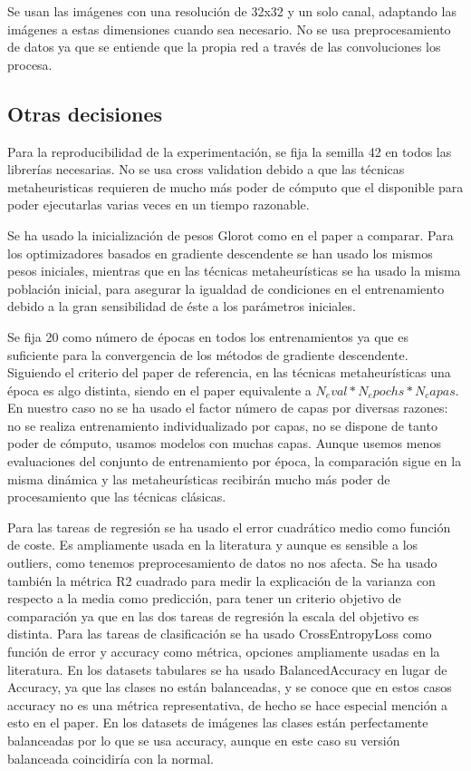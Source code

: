 Se usan las imágenes con una resolución de 32x32 y un solo canal, adaptando las imágenes a estas dimensiones cuando sea necesario. No se usa preprocesamiento de datos ya que se entiende que la propia red a través de las convoluciones los procesa.


\subsection{Otras decisiones}

Para la reproducibilidad de la experimentación, se fija la semilla 42 en todos las librerías necesarias. No se usa cross validation debido a que las técnicas metaheuristicas requieren de mucho más poder de cómputo que el disponible para poder ejecutarlas varias veces en un tiempo razonable.

Se ha usado la inicialización de pesos Glorot  como en el paper a comparar. Para los optimizadores basados en gradiente descendente se han usado los mismos pesos iniciales, mientras que en las técnicas metaheurísticas se ha usado la misma población inicial, para asegurar la igualdad de condiciones en el entrenamiento debido a la gran sensibilidad de éste a los parámetros iniciales. 

Se fija 20 como número de épocas en todos los entrenamientos ya que es suficiente para la convergencia de los métodos de gradiente descendente. Siguiendo el criterio del paper de referencia, en las técnicas metaheurísticas una época es algo distinta, siendo en el paper equivalente a $N_eval * N_epochs * N_capas$. En nuestro caso no se ha usado el factor número de capas por diversas razones: no se realiza entrenamiento individualizado por capas, no se dispone de tanto poder de cómputo, usamos modelos con muchas capas. Aunque usemos menos evaluaciones del conjunto de entrenamiento por época, la comparación sigue en la misma dinámica y las metaheurísticas recibirán mucho más poder de procesamiento que las técnicas clásicas.

Para las tareas de regresión se ha usado el error cuadrático medio como función de coste. Es ampliamente usada en la literatura y aunque es sensible a los outliers, como tenemos preprocesamiento de datos no nos afecta. Se ha usado también la métrica R2 cuadrado para medir la explicación de la varianza con respecto a la media como predicción, para tener un criterio objetivo de comparación ya que en las dos tareas de regresión la escala del objetivo es distinta. Para las tareas de clasificación se ha usado CrossEntropyLoss como función de error y accuracy como métrica, opciones ampliamente usadas en la literatura. En los datasets tabulares se ha usado BalancedAccuracy en lugar de Accuracy, ya que las clases no están balanceadas, y se conoce que en estos casos accuracy no es una métrica representativa, de hecho se hace especial mención a esto en el paper. En los datasets de imágenes las clases están perfectamente balanceadas por lo que se usa accuracy, aunque en este caso su versión balanceada coincidiría con la normal.



